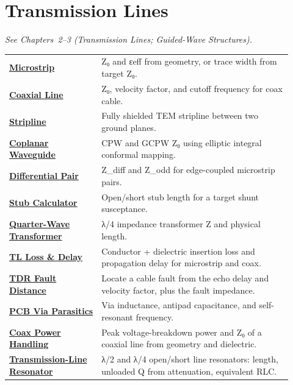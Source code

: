 \section*{Transmission Lines}
\noindent\emph{See Chapters~2--3 (Transmission Lines; Guided-Wave Structures).}
\begin{longtable}{>{\raggedright\arraybackslash}p{0.30\linewidth}>{\raggedright\arraybackslash}p{0.62\linewidth}}
\hline
\href{https://rftoolbox.ca/Microstrip.html}{\textbf{Microstrip}} & Z₀ and εeff from geometry, or trace width from target Z₀. \\
\href{https://rftoolbox.ca/Coaxial.html}{\textbf{Coaxial Line}} & Z₀, velocity factor, and cutoff frequency for coax cable. \\
\href{https://rftoolbox.ca/Stripline.html}{\textbf{Stripline}} & Fully shielded TEM stripline between two ground planes. \\
\href{https://rftoolbox.ca/CPW.html}{\textbf{Coplanar Waveguide}} & CPW and GCPW Z₀ using elliptic integral conformal mapping. \\
\href{https://rftoolbox.ca/DiffPair.html}{\textbf{Differential Pair}} & Z\_diff and Z\_odd for edge-coupled microstrip pairs. \\
\href{https://rftoolbox.ca/StubCalc.html}{\textbf{Stub Calculator}} & Open/short stub length for a target shunt susceptance. \\
\href{https://rftoolbox.ca/QuarterWave.html}{\textbf{Quarter-Wave Transformer}} & λ/4 impedance transformer Z and physical length. \\
\href{https://rftoolbox.ca/TLLoss.html}{\textbf{TL Loss \& Delay}} & Conductor + dielectric insertion loss and propagation delay for microstrip and coax. \\
\href{https://rftoolbox.ca/TDR.html}{\textbf{TDR Fault Distance}} & Locate a cable fault from the echo delay and velocity factor, plus the fault impedance. \\
\href{https://rftoolbox.ca/PCBVia.html}{\textbf{PCB Via Parasitics}} & Via inductance, antipad capacitance, and self-resonant frequency. \\
\href{https://rftoolbox.ca/CoaxPowerHandling.html}{\textbf{Coax Power Handling}} & Peak voltage-breakdown power and Z₀ of a coaxial line from geometry and dielectric. \\
\href{https://rftoolbox.ca/TLResonator.html}{\textbf{Transmission-Line Resonator}} & λ/2 and λ/4 open/short line resonators: length, unloaded Q from attenuation, equivalent RLC. \\
\hline
\end{longtable}

